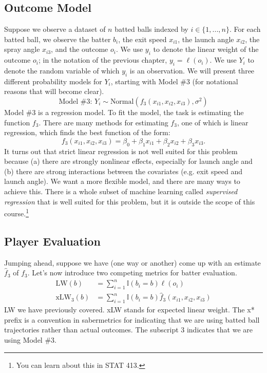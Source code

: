 \documentclass{article}
\begin{document}
  \subsection{\sc Outcome Model}

    Suppose we observe a dataset of $n$ batted balls indexed by $i \in \{1, ..., n\}$. For each batted ball, we observe the batter $b_i$, the exit speed $x_{i1}$, the launch angle $x_{i2}$, the spray angle $x_{i3}$, and the outcome $o_i$. We use $y_i$ to denote the linear weight of the outcome $o_i$; in the notation of the previous chapter, $y_i = \ell(o_i)$. We use $Y_i$ to denote the random variable of which $y_i$ is an observation. We will present three different probability models for $Y_i$, starting with Model \#3 (for notational reasons that will become clear).
    \begin{equation*}
      \mbox{Model \#3: }Y_i \sim \mbox{Normal}\left(f_3(x_{i1}, x_{i2}, x_{i3}), \sigma^2\right)
    \end{equation*}
    Model \#3 is a regression model. To fit the model, the task is estimating the function $f_3$. There are many methods for estimating $f_3$, one of which is linear regression, which finds the best function of the form:
    \begin{equation*}
      f_3(x_{i1}, x_{i2}, x_{i3}) = \beta_0 + \beta_1 x_{i1} + \beta_2 x_{i2} + \beta_3 x_{i3}.
    \end{equation*}
    It turns out that strict linear regression is not well suited for this problem because (a) there are strongly nonlinear effects, especially for launch angle and (b) there are strong interactions between the covariates (e.g. exit speed and launch angle). We want a more flexible model, and there are many ways to achieve this. There is a whole subset of machine learning called {\it supervised regression} that is well suited for this problem, but it is outside the scope of this course.\footnote{You can learn about this in STAT 413.}

  \subsection{\sc Player Evaluation}

    Jumping ahead, suppose we have (one way or another) come up with an estimate $\hat f_3$ of $f_3$. Let's now introduce two competing metrics for batter evaluation.
    \begin{align*}
      \mbox{LW}(b) &= \sum_{i = 1}^n \mathbb{I}(b_i = b) \ell(o_i)\\
      \mbox{xLW}_3(b) &= \sum_{i = 1}^n \mathbb{I}(b_i = b) \hat f_3(x_{i1}, x_{i2}, x_{i3})
    \end{align*}
    LW we have previously covered. xLW stands for expected linear weight. The x* prefix is a convention in sabermetrics for indicating that we are using batted ball trajectories rather than actual outcomes. The subscript 3 indicates that we are using Model \#3.
\end{document}
